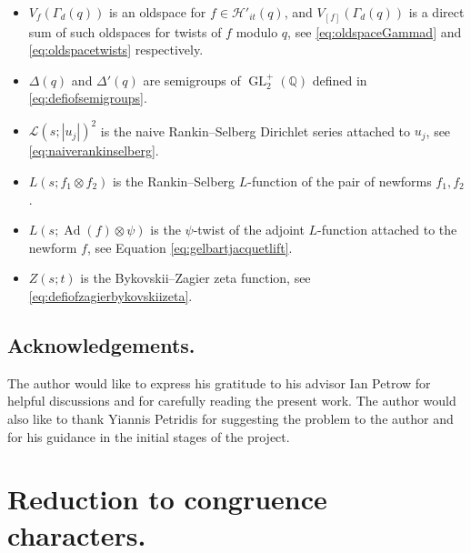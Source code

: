 \documentclass{article}
\theoremstyle{named}
\newcommand{\HH}{\mathcal{H}}
\renewcommand{\L}{\mathcal{L}}
\newcommand{\Q}{\mathbb{Q}}
\DeclareMathOperator{\GL}{GL}
\DeclareMathOperator{\Ad}{Ad}
\begin{document}
\begin{itemize}
    \item $V_f(\Gamma_d(q))$ is an oldspace for $f \in \HH'_{it}(q)$, and $V_{[f]}(\Gamma_d(q))$ is a direct sum of such oldspaces for twists of $f$ modulo $q$, see \eqref{eq:oldspaceGammad} and \eqref{eq:oldspacetwists} respectively.
    \item $\Delta(q)$ and $\Delta'(q)$ are semigroups of $\GL_2^+(\Q)$ defined in \eqref{eq:defiofsemigroups}.
    \item $\L(s; |u_j|)^2$ is the naive Rankin--Selberg Dirichlet series attached to $u_j$, see \eqref{eq:naiverankinselberg}.
    \item $L(s; f_1 \otimes f_2)$ is the Rankin--Selberg $L$-function of the pair of newforms $f_1, f_2$.
    \item $L(s; \Ad(f)\otimes \psi)$ is the $\psi$-twist of the adjoint $L$-function attached to the newform $f$, see Equation \eqref{eq:gelbartjacquetlift}.
    \item $Z(s; t)$ is the Bykovskii--Zagier zeta function, see \eqref{eq:defiofzagierbykovskiizeta}.  
\end{itemize}

\subsection{Acknowledgements.}
The author would like to express his gratitude to his advisor Ian Petrow for helpful discussions and for carefully reading the present work. The author would also like to thank Yiannis Petridis for suggesting the problem to the author and for his guidance in the initial stages of the project.


\section{Reduction to congruence characters.}\label{sec:reductiontocongruencecharacters}
\end{document}
